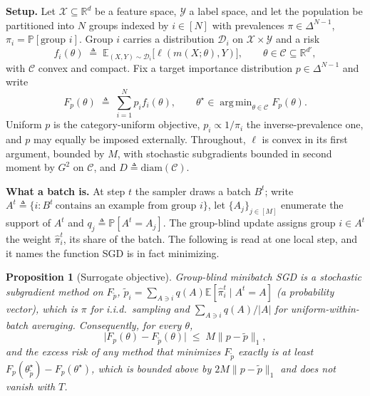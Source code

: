 \documentclass{article}
\newtheorem{proposition}[theorem]{Proposition}
\theoremstyle{definition}
\newcommand{\R}{\mathbb{R}}
\newcommand{\E}{\mathbb{E}}
\newcommand{\PP}{\mathbb{P}}
\newcommand{\Nn}[1]{[#1]}
\newcommand{\simplex}[1]{\Delta^{#1-1}}
\DeclareMathOperator*{\argmin}{arg\,min}
\begin{document}
\noindent\textbf{Setup.}
Let $\mathcal{X}\subseteq\R^d$ be a feature space, $\mathcal{Y}$ a label space,
and let the population be partitioned into $N$ groups indexed by $i\in\Nn{N}$
with prevalences $\pi\in\simplex{N}$, $\pi_i=\PP[\text{group }i]$. Group $i$
carries a distribution $\mathcal{D}_i$ on $\mathcal{X}\times\mathcal{Y}$ and a
risk
\[
f_i(\theta)\;\triangleq\;\E_{(X,Y)\sim\mathcal{D}_i}\big[\ell(m(X;\theta),Y)\big],
\qquad \theta\in\mathcal{C}\subseteq\R^{d'},
\]
with $\mathcal{C}$ convex and compact. Fix a target importance distribution
$p\in\simplex{N}$ and write
\begin{equation}
F_p(\theta)\;\triangleq\;\sum_{i=1}^{N}p_i f_i(\theta),
\qquad
\theta^\star\in\argmin_{\theta\in\mathcal{C}}F_p(\theta).
\label{eq:target}
\end{equation}
Uniform $p$ is the category-uniform objective, $p_i\propto 1/\pi_i$ the
inverse-prevalence one, and $p$ may equally be imposed externally. Throughout,
$\ell$ is convex in its first argument, bounded by $M$, with stochastic
subgradients bounded in second moment by $G^2$ on $\mathcal{C}$, and
$D\triangleq\mathrm{diam}(\mathcal{C})$.

\noindent\textbf{What a batch is.}
At step $t$ the sampler draws a batch $B^t$; write
$A^t\triangleq\{i: B^t\ \text{contains an example from group }i\}$, let
$\{A_j\}_{j\in\Nn{M}}$ enumerate the support of $A^t$ and
$q_j\triangleq\PP[A^t=A_j]$. The group-blind update assigns group $i\in A^t$ the
weight $\widehat{\pi}^t_i$, its share of the batch. The following is
\cite[Eq.~2]{rahimi2025fedavot} read at one local step, and it names the
function SGD is in fact minimizing.

\begin{proposition}[Surrogate objective]
\label{prop:surrogate}
Group-blind minibatch SGD is a stochastic subgradient method on $F_{\tilde p}$,
$\tilde p_i=\sum_{A\ni i}q(A)\E[\widehat{\pi}^t_i\mid A^t=A]$ (a probability
vector), which is $\pi$
for i.i.d.\ sampling and $\sum_{A\ni i}q(A)/|A|$ for uniform-within-batch
averaging. Consequently, for every $\theta$,
\begin{equation}
\big|F_p(\theta)-F_{\tilde p}(\theta)\big|\;\le\;M\|p-\tilde p\|_1 ,
\label{eq:surrogate-gap}
\end{equation}
and the excess risk of any method that minimizes $F_{\tilde p}$ exactly is at
least $F_p(\theta^\star_{\tilde p})-F_p(\theta^\star)$, which is bounded above
by $2M\|p-\tilde p\|_1$ and does not vanish with $T$.
\end{proposition}
\end{document}

